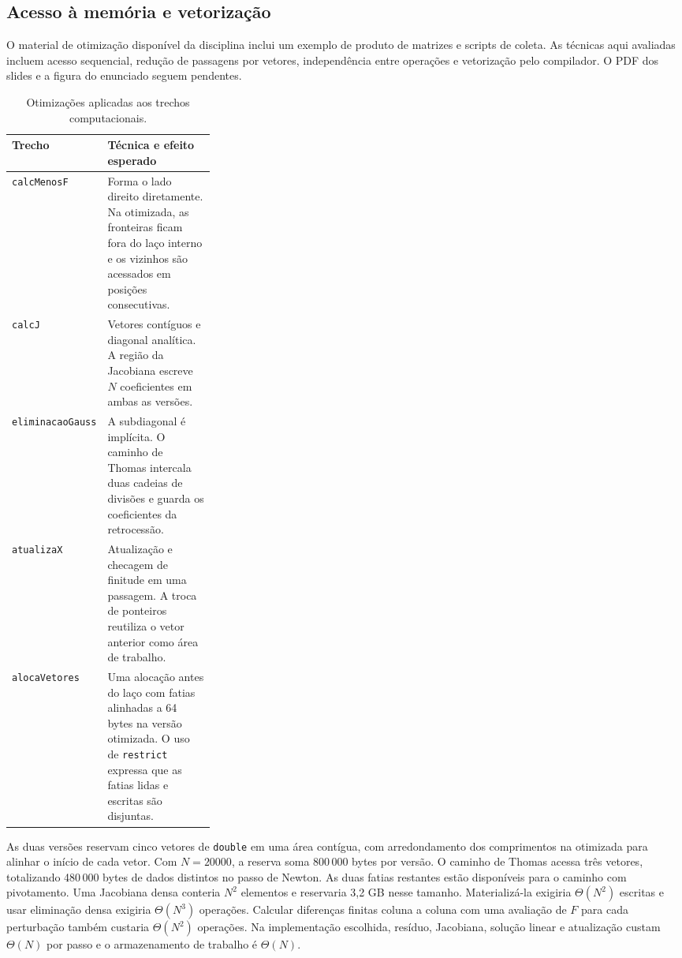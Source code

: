 \documentclass[11pt,a4paper]{article}
\begin{document}
\subsection{Acesso à memória e vetorização}

O material de otimização disponível da disciplina inclui um exemplo de produto de matrizes e scripts de coleta. As técnicas aqui avaliadas incluem acesso sequencial, redução de passagens por vetores, independência entre operações e vetorização pelo compilador. O PDF dos slides e a figura do enunciado seguem pendentes.

\begin{table}[H]
\centering
\small
\begin{tabularx}{\linewidth}{@{}p{0.30\linewidth}X@{}}
\toprule
Trecho & Técnica e efeito esperado \\
\midrule
\texttt{calcMenosF} & Forma o lado direito diretamente. Na otimizada, as fronteiras ficam fora do laço interno e os vizinhos são acessados em posições consecutivas. \\
\texttt{calcJ} & Vetores contíguos e diagonal analítica. A região da Jacobiana escreve $N$ coeficientes em ambas as versões. \\
\texttt{eliminacaoGauss} & A subdiagonal é implícita. O caminho de Thomas intercala duas cadeias de divisões e guarda os coeficientes da retrocessão. \\
\texttt{atualizaX} & Atualização e checagem de finitude em uma passagem. A troca de ponteiros reutiliza o vetor anterior como área de trabalho. \\
\texttt{alocaVetores} & Uma alocação antes do laço com fatias alinhadas a 64 bytes na versão otimizada. O uso de \texttt{restrict} expressa que as fatias lidas e escritas são disjuntas. \\
\bottomrule
\end{tabularx}
\caption{Otimizações aplicadas aos trechos computacionais.}
\end{table}

As duas versões reservam cinco vetores de \texttt{double} em uma área contígua, com arredondamento dos comprimentos na otimizada para alinhar o início de cada vetor. Com $N=20000$, a reserva soma 800\,000 bytes por versão. O caminho de Thomas acessa três vetores, totalizando 480\,000 bytes de dados distintos no passo de Newton. As duas fatias restantes estão disponíveis para o caminho com pivotamento. Uma Jacobiana densa conteria $N^2$ elementos e reservaria 3,2 GB nesse tamanho. Materializá-la exigiria $\Theta(N^2)$ escritas e usar eliminação densa exigiria $\Theta(N^3)$ operações. Calcular diferenças finitas coluna a coluna com uma avaliação de $F$ para cada perturbação também custaria $\Theta(N^2)$ operações. Na implementação escolhida, resíduo, Jacobiana, solução linear e atualização custam $\Theta(N)$ por passo e o armazenamento de trabalho é $\Theta(N)$.
\end{document}
